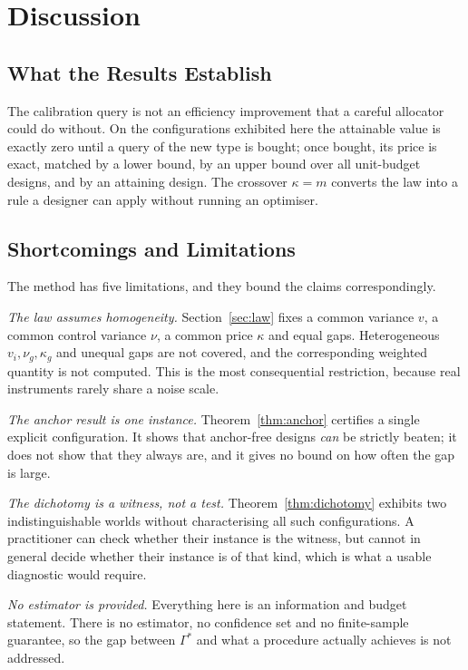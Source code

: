 \documentclass[conference]{IEEEtran}
\theoremstyle{definition}
\begin{document}
\section{Discussion}
\label{sec:discussion}

\subsection{What the Results Establish}

The calibration query is not an efficiency improvement that a careful allocator could do
without. On the configurations exhibited here the attainable value is exactly zero until a
query of the new type is bought; once bought, its price is exact, matched by a lower bound,
by an upper bound over all unit-budget designs, and by an attaining design. The crossover
$\kappa=m$ converts the law into a rule a designer can apply without running an optimiser.

\subsection{Shortcomings and Limitations}

The method has five limitations, and they bound the claims correspondingly.

\emph{The law assumes homogeneity.} Section~\ref{sec:law} fixes a common variance $v$, a
common control variance $\nu$, a common price $\kappa$ and equal gaps. Heterogeneous
$v_{i},\nu_{g},\kappa_{g}$ and unequal gaps are not covered, and the corresponding weighted
quantity is not computed. This is the most consequential restriction, because real
instruments rarely share a noise scale.

\emph{The anchor result is one instance.} Theorem~\ref{thm:anchor} certifies a single
explicit configuration. It shows that anchor-free designs \emph{can} be strictly beaten; it
does not show that they always are, and it gives no bound on how often the gap is large.

\emph{The dichotomy is a witness, not a test.} Theorem~\ref{thm:dichotomy} exhibits two
indistinguishable worlds without characterising all such configurations. A practitioner can
check whether their instance is the witness, but cannot in general decide whether their
instance is of that kind, which is what a usable diagnostic would require.

\emph{No estimator is provided.} Everything here is an information and budget statement.
There is no estimator, no confidence set and no finite-sample guarantee, so the gap between
$\Gamma^{*}$ and what a procedure actually achieves is not addressed.
\end{document}
